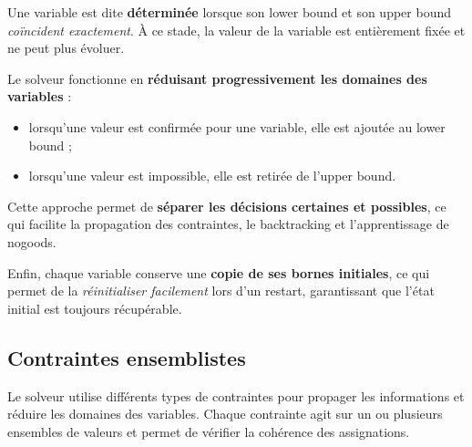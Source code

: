 \documentclass{article}
\begin{document}
Une variable est dite \textbf{déterminée} lorsque son lower bound et son upper bound \emph{coïncident exactement}. 
À ce stade, la valeur de la variable est entièrement fixée et ne peut plus évoluer.

Le solveur fonctionne en \textbf{réduisant progressivement les domaines des variables} :
\begin{itemize}
    \item lorsqu'une valeur est confirmée pour une variable, elle est ajoutée au lower bound ;
    \item lorsqu'une valeur est impossible, elle est retirée de l'upper bound.
\end{itemize}

Cette approche permet de \textbf{séparer les décisions certaines et possibles}, ce qui facilite la propagation des contraintes, le backtracking et l'apprentissage de nogoods.

Enfin, chaque variable conserve une \textbf{copie de ses bornes initiales}, ce qui permet de la \emph{réinitialiser facilement} lors d'un restart, garantissant que l'état initial est toujours récupérable.



\subsection{Contraintes ensemblistes}

Le solveur utilise différents types de contraintes pour propager les informations et réduire les domaines des variables. Chaque contrainte agit sur un ou plusieurs ensembles de valeurs et permet de vérifier la cohérence des assignations.
\end{document}
